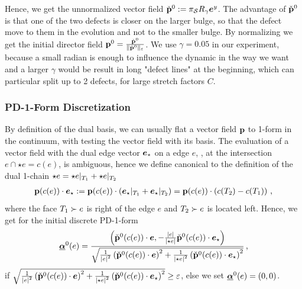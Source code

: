 \documentclass[a4paper,11pt]{scrartcl}
\newcommand{\EuBase}[1]{\eb^{#1}}
\newcommand{\pstretch}{C}
\begin{document}
Hence, we get the unnormalized vector field \( \check{\pb}^{0} := \ProjectSurf R_{\gamma} \EuBase{y} \).
The advantage of \( \check{\mathbf{p}}^{0} \) is that one of the two defects is closer on the larger bulge,
so that the defect move to them in the evolution and not to the smaller bulge.
By normalizing we get the initial director field \( \mathbf{p}^{0} = \frac{\check{\mathbf{p}}^{0}}{\|\check{\mathbf{p}}^{0}\|_{\varepsilon}} \).
We use \( \gamma = 0.05 \) in our experiment, because a small radian is enough to influence the dynamic in the way we want
and a larger \( \gamma \) would be result in long "defect lines" at the beginning, 
which can particular split up to 2 defects, for large stretch factors \( \pstretch \).

\subsubsection{PD-1-Form Discretization}
By definition of the dual basis, we can usually flat a vector field \( \mathbf{p} \) to 1-form in the continuum, 
with testing the vector field with its basis.
The evaluation of a vector field with the dual edge vector \( \bm{e}_{\star} \) on a edge \( e \), 
\ie, at the intersection \( e\cap\star e = c(e) \), is ambiguous, 
hence we define canonical to the definition of the dual 1-chain \( \star e = \star e|_{T_{1}} + \star e|_{T_{2}}\)
\begin{align}
  \mathbf{p}(c(e))\cdot\bm{e}_{\star} :=  \mathbf{p}(c(e)) \cdot \left( \bm{e}_{\star}|_{T_{1}} +  \bm{e}_{\star}|_{T_{2}}\right)
            = \mathbf{p}(c(e)) \cdot \left( c(T_{2}) - c(T_{1}) \right) \,\text{,}
\end{align}
where the face \( T_{1}\succ e \) is right of the edge \( e \) and \( T_{2}\succ e \) is located left.
Hence, we get for the initial discrete PD-1-form
\begin{align}
  \underline{\bm{\alpha}}^{0}(e) = \frac{\left( \check{\mathbf{p}}^{0}(c(e)) \cdot \bm{e} ,
                                -\frac{\left| e \right|}{\left| \star e \right|}\check{\mathbf{p}}^{0}(c(e)) \cdot \bm{e}_{\star} \right)}
                        {\sqrt{\frac{1}{\left| e \right|^{2}}\left( \check{\mathbf{p}}^{0}(c(e)) \cdot \bm{e} \right)^{2}
                                 +\frac{1}{\left| \star e \right|^{2}}
                                    \left(\check{\mathbf{p}}^{0}(c(e)) \cdot \bm{e}_{\star}  \right)^{2} }} \,\text{,}
\end{align}
if \( \sqrt{\frac{1}{\left| e \right|^{2}}\left( \check{\mathbf{p}}^{0}(c(e)) \cdot \bm{e} \right)^{2}
                                 +\frac{1}{\left| \star e \right|^{2}}
                                    \left(\check{\mathbf{p}}^{0}(c(e)) \cdot \bm{e}_{\star}  \right)^{2} }  \ge  \varepsilon\),
else we set \( \underline{\bm{\alpha}}^{0}(e) = (0,0) \).
\end{document}
